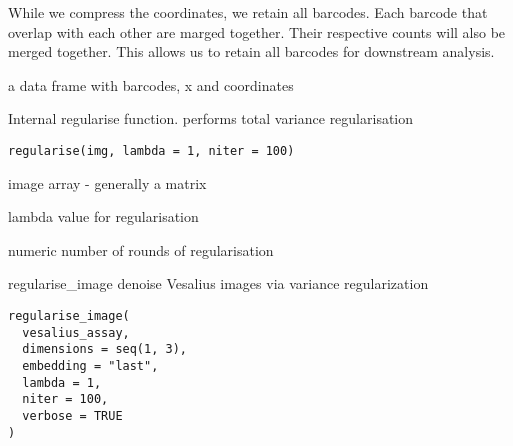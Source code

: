 \documentclass[a4paper]{book}
\begin{document}
%
\begin{Details}
While we compress the coordinates, we retain all barcodes. 
Each barcode that overlap with each other are marged together. Their 
respective counts will also be merged together. This allows us to 
retain all barcodes for downstream analysis.
\end{Details}
%
\begin{Value}
a data frame with barcodes, x and coordinates
\end{Value}
%
\begin{Description}
Internal regularise function.
performs total variance regularisation
\end{Description}
%
\begin{Usage}
\begin{verbatim}
regularise(img, lambda = 1, niter = 100)
\end{verbatim}
\end{Usage}
%
\begin{Arguments}
\begin{ldescription}
\item[\code{img}] image array - generally a matrix

\item[\code{lambda}] lambda value for regularisation

\item[\code{niter}] numeric number of rounds of regularisation
\end{ldescription}
\end{Arguments}
%
\begin{Description}
regularise\_image denoise Vesalius images via variance regularization
\end{Description}
%
\begin{Usage}
\begin{verbatim}
regularise_image(
  vesalius_assay,
  dimensions = seq(1, 3),
  embedding = "last",
  lambda = 1,
  niter = 100,
  verbose = TRUE
)
\end{verbatim}
\end{Usage}
%
\end{document}
